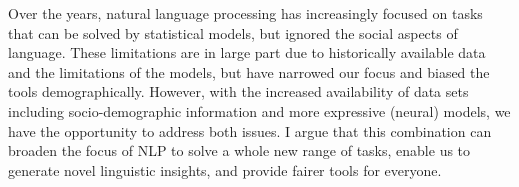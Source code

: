 Over the years, natural language processing has increasingly focused on tasks that can be solved by statistical models, but ignored the social aspects of language. These limitations are in large part due to historically available data and the limitations of the models, but have narrowed our focus and biased the tools demographically. However, with the increased availability of data sets including socio-demographic information and more expressive (neural) models, we have the opportunity to address both issues. I argue that this combination can broaden the focus of NLP to solve a whole new range of tasks, enable us to generate novel linguistic insights, and provide fairer tools for everyone.
